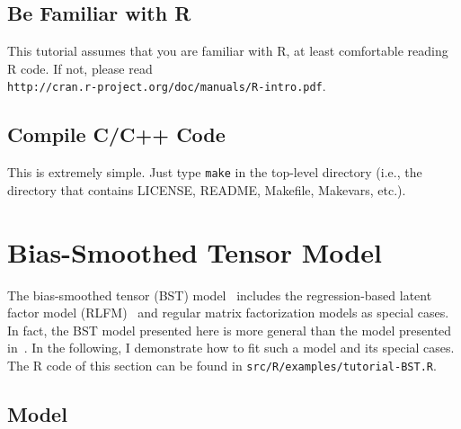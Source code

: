 \documentclass[10pt]{article}
\begin{document}
\subsection{Be Familiar with R}

This tutorial assumes that you are familiar with R, at least comfortable reading R code.  If not, please read \\
{\tt http://cran.r-project.org/doc/manuals/R-intro.pdf}.

\subsection{Compile C/C++ Code}

This is extremely simple.  Just type {\tt make} in the top-level directory (i.e., the directory that contains LICENSE, README, Makefile, Makevars, etc.).

\section{Bias-Smoothed Tensor Model}

The bias-smoothed tensor (BST) model~\cite{bst:kdd11} includes the regression-based latent factor model (RLFM)~\cite{rlfm:kdd09} and regular matrix factorization models as special cases.  In fact, the BST model presented here is more general than the model presented in~\cite{bst:kdd11}.  In the following, I demonstrate how to fit such a model and its special cases.  The R code of this section can be found in {\tt src/R/examples/tutorial-BST.R}.

\subsection{Model}
\end{document}
